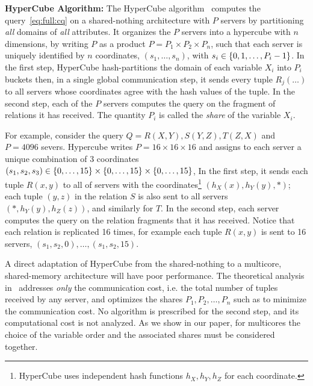 \addvspace{\smallskipamount}
\noindent\textbf{HyperCube Algorithm:} The HyperCube algorithm~\cite{DBLP:conf/edbt/AfratiU10,DBLP:journals/jacm/BeameKS17,DBLP:conf/icdt/KoutrisBS16}
computes the query~\eqref{eq:full:cq} on a shared-nothing architecture
with $P$ servers by partitioning \emph{all} domains of \emph{all}
attributes. It organizes the $P$ servers into a hypercube with $n$
dimensions, by writing $P$ as a product
$P = P_1 \times P_2 \times P_n$, such that each server is uniquely
identified by $n$ coordinates, $(s_1, \ldots, s_n)$, with
$s_i \in \{0,1,\ldots,P_i-1\}$.  In the first step, HyperCube hash-partitions the
domain of each variable $X_i$ into $P_i$ buckets then, in a single
global communication step, it sends every tuple $R_j(\ldots)$ to all
servers whose coordinates agree with the hash values of the tuple. In
the second step, each of the $P$ servers computes the query on the
fragment of relations it has received.  The quantity $P_i$ is called
the \emph{share} of the variable $X_i$.

For example, consider the query $Q=R(X,Y),S(Y,Z),T(Z,X)$ and $P=4096$
severs.  Hypercube writes $P=16 \times 16 \times 16$ and assigns to each
server a unique combination of 3 coordinates
$(s_1, s_2, s_3) \in
\{0,\ldots,15\}\times\{0,\ldots,15\}\times\{0,\ldots,15\}$,  
In the first step, it sends each tuple $R(x,y)$ to all of servers with the
coordinates\footnote{HyperCube uses independent hash functions
  $h_X, h_Y, h_Z$ for each coordinate.}  $(h_X(x),h_Y(y), *)$; each
tuple $(y,z)$ in the relation $S$ is also sent to all servers $(*,h_Y(y),h_Z(z))$, and
similarly for $T$. In the second step, each server computes the query
on the relation fragments that it has received.  Notice that each
relation is replicated 16 times, for example each tuple $R(x,y)$ is
sent to 16 servers, $(s_1,s_2,0), \ldots, (s_1,s_2,15)$.

A direct adaptation of HyperCube from the shared-nothing to a
multicore, shared-memory architecture will have poor performance.
The theoretical analysis in~\cite{DBLP:journals/sigmod/KoutrisS16}
addresses \emph{only} the communication cost, i.e. the total number of
tuples received by any server, and optimizes the shares
$P_1, P_2, \ldots, P_n$ such as to minimize the communication cost.
No algorithm is prescribed for the second step, and its computational
cost is not analyzed.  As we show in our paper, for multicores the
choice of the variable order and the associated shares must be
considered together.

